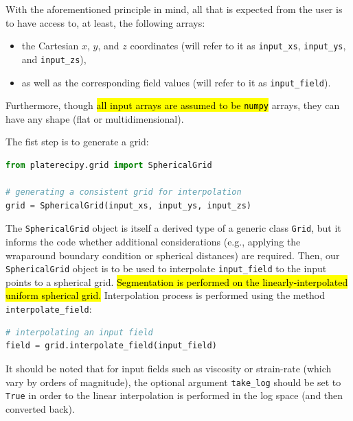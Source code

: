 \documentclass[12pt,letterpaper]{article}
\begin{document}
With the aforementioned principle in mind, all that is expected from the user 
is to have access to, at least, the following arrays:
\begin{itemize}
    \item the Cartesian $x$, $y$, and $z$ coordinates (will refer to it as \texttt{input\_xs}, \texttt{input\_ys}, and \texttt{input\_zs}),
    \item as well as the corresponding field values (will refer to it as \texttt{input\_field}).
\end{itemize}
Furthermore, though \hl{all input arrays are assumed to be \texttt{numpy}} \parencite{numpy} arrays,
they can have any shape (flat or multidimensional).

The fist step is to generate a grid:
\begin{lstlisting}[language=Python]
from platerecipy.grid import SphericalGrid

# generating a consistent grid for interpolation
grid = SphericalGrid(input_xs, input_ys, input_zs)
\end{lstlisting}
The \texttt{SphericalGrid} object is itself a derived type of a generic class 
\texttt{Grid}, but it informs the code whether additional considerations (e.g., 
applying the wraparound boundary condition or spherical distances) are required.
Then, our \texttt{SphericalGrid} object is to be used to interpolate \texttt{input\_field}
to the input points to a spherical grid. \hl{Segmentation is performed on the linearly-interpolated uniform spherical grid.} Interpolation process is 
performed using the method \texttt{interpolate\_field}:
\begin{lstlisting}[language=Python]
# interpolating an input field
field = grid.interpolate_field(input_field)
\end{lstlisting}
It should be noted that for input fields such as viscosity or strain-rate
(which vary by orders of magnitude), the optional argument \texttt{take\_log}
should be set to \texttt{True} in order to the linear interpolation is performed in the log space (and then converted back).
\end{document}
